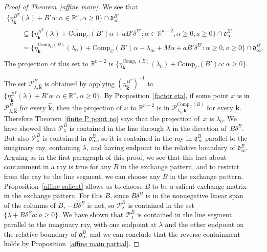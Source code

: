 \documentclass{amsart}
\theoremstyle{definition}
\theoremstyle{remark}
\numberwithin{equation}{section}
\newcommand{\reals}{\mathbb R}
\newcommand{\set}[1]{{\lbrace #1 \rbrace}}
\newcommand{\0}{{\mathbf{0}}}
\newcommand{\Comp}{\mathrm{Comp}_C}
\newcommand{\CompPlus}{\overline{\mathrm{Comp}}_C}
\newcommand{\kk}{{\boldsymbol{k}}}
\renewcommand{\P}{\mathcal{P}}
\renewcommand{\d}{{\mathfrak d}}
\begin{document}
\begin{proof}[Proof of Theorem~\ref{affine main}]
We see that 
\begin{multline*}
  \set{\eta_{\widehat\kk}^{B^T}(\lambda)+B'\alpha:\alpha\in\reals^n,\alpha\ge0}\cap\d^{B'}_\infty\\
\begin{aligned}
&\quad\subseteq\set{\eta_{\widehat\kk}^{B^T}(\lambda)+\CompPlus(B')\alpha+aB'\delta^{B'}:\alpha\in\reals^{n-2},\alpha\ge0,a\ge0}\cap\d^{B'}_\infty\\
&\quad=\set{\eta_\kk^{\Comp(B)}(\lambda_0)+\Comp(B')\alpha+\lambda_\infty+M\alpha+aB'\delta^{B'}:\alpha\ge0,a\ge0}\cap\d^{B'}_\infty.\\
\end{aligned}
\end{multline*}
The projection of this set to $\reals^{n-2}$ is $\set{\eta_\kk^{\Comp(B)}(\lambda_0)+\Comp(B')\alpha:\alpha\ge0}$.

The set $\P^B_{\lambda,\widehat\kk}$ is obtained by applying $(\eta_{\widehat\kk}^{B^T})^{-1}$ to $\set{\eta_{\widehat\kk}^{B^T}(\lambda)+B'\alpha:\alpha\in\reals^n,\alpha\ge0}$.
By Proposition~\ref{factor eta}, if some point $x$ is in $\P^B_{\lambda,\widehat\kk}$  
for every $\widehat\kk$, then the projection of $x$ to $\reals^{n-2}$ is in $\P^{\Comp(B)}_{\lambda_0,\kk}$ for every $\kk$.
Therefore Theorem~\ref{finite P point no} says that the projection of~$x$ is $\lambda_0$.
We have showed that $\P^B_\lambda$ is contained in the line through $\lambda$ in the direction of~$B\delta^B$.
But also $\P^B_\lambda$ is contained in $\d^B_\infty$, so it is contained in the ray in $\d^B_\infty$ parallel to the imaginary ray, containing $\lambda$, and having endpoint in the relative boundary of $\d^B_\infty$.
Arguing as in the first paragraph of this proof, we see that this fact about containment in a ray is true for any $B$ in the exchange pattern, and to restrict from the ray to the line segment, we can choose any $B$ in the exchange pattern.
Proposition~\ref{affine salient} allows us to choose $B$ to be a salient exchange matrix in the exchange pattern.
For this $B$, since $B\delta^B$ is in the nonnegative linear span of the columns of $B$, $-B\delta^B$ is not, so $\P^B_\lambda$ is contained in the set $\set{\lambda+B\delta^Ba:a\ge0}$.
We have shown that $\P^B_\lambda$ is contained in the line segment parallel to the imaginary ray, with one endpoint at $\lambda$ and the other endpoint on the relative boundary of $\d^B_\infty$ and we can conclude that the reverse containment holds by Proposition~\ref{affine main partial}.
\end{proof}
\end{document}
